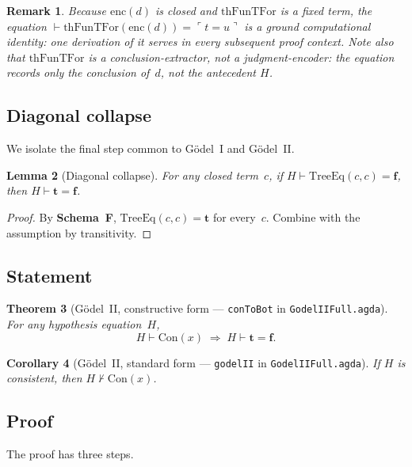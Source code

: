 \documentclass[11pt]{article}
\newtheorem{theorem}{Theorem}
\newtheorem{lemma}[theorem]{Lemma}
\newtheorem{corollary}[theorem]{Corollary}
\newtheorem{remark}[theorem]{Remark}
\newcommand{\trueT}{\mathbf{t}}
\newcommand{\falseT}{\mathbf{f}}
\newcommand{\SchemaF}{\textbf{Schema~F}}
\newcommand{\code}[1]{\ulcorner #1 \urcorner}
\newcommand{\thFunTFor}{\mathrm{thFunTFor}}
\newcommand{\TreeEq}{\mathrm{TreeEq}}
\begin{document}
\begin{remark}
Because $\mathrm{enc}(d)$ is closed and $\thFunTFor$ is a fixed
term, the equation $\vdash \thFunTFor(\mathrm{enc}(d)) = \code{t = u}$
is a \emph{ground computational identity}: one derivation of it
serves in every subsequent proof context.  Note also that
$\thFunTFor$ is a conclusion-extractor, not a judgment-encoder:
the equation records only the conclusion of~$d$, not the
antecedent $H$.
\end{remark}

\subsection{Diagonal collapse}

We isolate the final step common to G\"odel~I and G\"odel~II.

\begin{lemma}[Diagonal collapse]
\label{lem:diagCollapse}
For any closed term~$c$, if
$H \vdash \TreeEq(c, c) = \falseT$, then
$H \vdash \trueT = \falseT$.
\end{lemma}

\begin{proof}
By \SchemaF{}, $\TreeEq(c, c) = \trueT$ for every~$c$.
Combine with the assumption by transitivity.
\end{proof}

\subsection{Statement}

\begin{theorem}[G\"odel~II, constructive form --- \texttt{conToBot} in \texttt{GodelIIFull.agda}]
\label{thm:godel2cf}
For any hypothesis equation~$H$,
\[
  H \vdash \mathrm{Con}(x) \;\Longrightarrow\;
  H \vdash \trueT = \falseT.
\]
\end{theorem}

\begin{corollary}[G\"odel~II, standard form --- \texttt{godelII} in \texttt{GodelIIFull.agda}]
\label{thm:godel2s}
If $H$ is consistent, then $H \nvdash \mathrm{Con}(x)$.
\end{corollary}

\subsection{Proof}

The proof has three steps.
\end{document}
